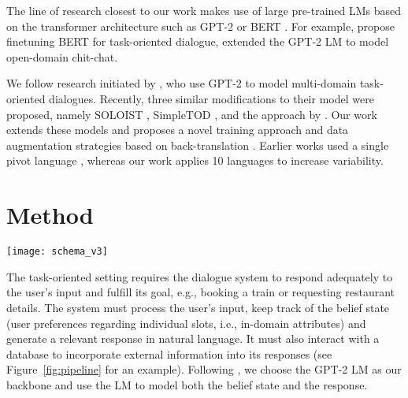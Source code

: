 \documentclass[11pt]{article}
\newcommand{\augpt}[0]{AuGPT\xspace}
\begin{document}
The line of research closest to our work makes use of large pre-trained LMs 
based on the transformer architecture \cite{vaswani2017} such as GPT-2 \cite{radford2019} or BERT \cite{devlin2019}. 
For example, \citet{wu2020}
propose finetuning BERT \cite{devlin2019} for task-oriented dialogue,
\citet{zhang2020dialogpt} extended the GPT-2 LM to model open-domain chit-chat.

We follow research initiated by \citet{budzianowski2019}, who use GPT-2 to model multi-domain task-oriented dialogues.  
Recently, three similar modifications to their model were proposed, namely SOLOIST \cite{peng2020}, SimpleTOD \cite{hosseini2020}, and the approach by \citet{ham2020}. 
Our work extends these models and proposes a novel training approach and data augmentation strategies based on back-translation \cite{edunov2018,federmann2019multilingual}. Earlier works used a single pivot language \cite{jin-etal-2018, Einolghozati2019}, whereas our work applies 10 languages to increase variability.

\section{Method}
\label{sec:method}

\begin{figure*}[htbp]
\centering
\texttt{[image: schema\_v3]}
\caption{The architecture of \augpt. The pipeline runs in two stages. First, a finetuned GPT-2 LM is used to predict a belief. Then the database results are obtained and everything is passed to the GPT-2 again to predict a final delexicalized response, along with possible auxiliary tasks (belief consistency, intent classification, system action classification). Unlikelihood loss is used for response prediction training.}
\label{fig:pipeline}
\end{figure*}

The task-oriented setting requires the dialogue system to respond adequately to the user's input and fulfill its goal, 
e.g., booking a train or requesting restaurant details. 
The system must process the user's input, keep track of the belief state (user preferences regarding individual slots, i.e., in-domain attributes) and generate a relevant response in natural language. It must also interact with a database to incorporate external information into its responses (see Figure~\ref{fig:pipeline} for an example).
Following \citet{budzianowski2019}, we choose the GPT-2 LM as our backbone and use the LM to model both the belief state and the response.
\end{document}
